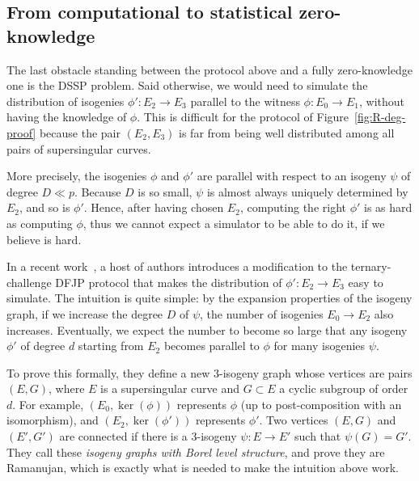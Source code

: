 \subsection{From computational to statistical zero-knowledge}
\label{sec:from-comp-stat}

The last obstacle standing between the protocol above and a fully
zero-knowledge one is the DSSP problem. Said otherwise, we would need
to simulate the distribution of isogenies $\phi': E_2\to E_3$ parallel
to the witness $\phi: E_0\to E_1$, without having the knowledge of
$\phi$.  This is difficult for the protocol of
Figure~\ref{fig:R-deg-proof} because the pair $(E_2,E_3)$ is far from
being well distributed among all pairs of supersingular curves.

More precisely, the isogenies $\phi$ and $\phi'$ are parallel with
respect to an isogeny $\psi$ of degree $D \ll p$.  Because $D$ is so
small, $\psi$ is almost always uniquely determined by $E_2$, and so is
$\phi'$.  Hence, after having chosen $E_2$, computing the right
$\phi'$ is as hard as computing $\phi$, thus we cannot expect a
simulator to be able to do it, if we believe \R[deg] is hard.

In a recent work~\cite{cryptoeprint:2022/1469}, a host of
authors introduces a modification to the ternary-challenge DFJP
protocol that makes the distribution of $\phi':E_2\to E_3$ easy to
simulate. The intuition is quite simple: by the expansion properties
of the isogeny graph, if we increase the degree $D$ of $\psi$, the
number of isogenies $E_0\to E_2$ also increases.  Eventually, we
expect the number to become so large that any isogeny $\phi'$
of degree $d$ starting from $E_2$ becomes parallel to $\phi$ for many
isogenies $\psi$.

To prove this formally, they define a new $3$-isogeny graph whose
vertices are pairs $(E,G)$, where $E$ is a supersingular curve and
$G\subset E$ a cyclic subgroup of order $d$. For example,
$(E_0,\ker(\phi))$ represents $\phi$ (up to post-composition with an
isomorphism), and $(E_2,\ker(\phi'))$ represents $\phi'$. Two vertices
$(E,G)$ and $(E',G')$ are connected if there is a $3$-isogeny
$\psi:E\to E'$ such that $\psi(G) = G'$. They call these \emph{isogeny
  graphs with Borel level structure}, and prove they are Ramanujan,
which is exactly what is needed to make the intuition above work.

